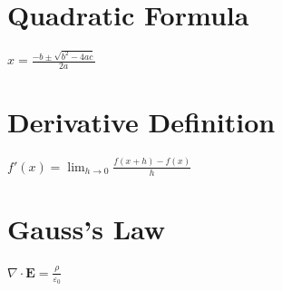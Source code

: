 \documentclass{article}
\begin{document}
\section{Quadratic Formula}
$x = \frac{-b \pm \sqrt{b^2 - 4ac}}{2a}$

\section{Derivative Definition}
$f'(x) = \lim_{h \to 0} \frac{f(x+h) - f(x)}{h}$

\section{Gauss's Law}
$\nabla \cdot \mathbf{E} = \frac{\rho}{\varepsilon_0}$
\end{document}
